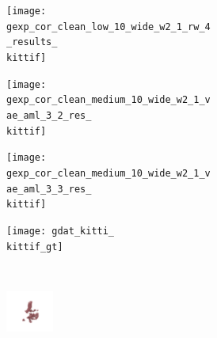 \begin{figure}[t]
{\begin{subfigure}[t]{0.5\textwidth}
\begin{subfigure}[t]{0.15\textwidth}
			\vspace{0px}\centering
			\texttt{[image: gexp\_cor\_clean\_low\_10\_wide\_w2\_1\_rw\_4\_results\_\\kittif]}
		\end{subfigure}
		\begin{subfigure}[t]{0.15\textwidth}
			\vspace{0px}\centering
			\texttt{[image: gexp\_cor\_clean\_medium\_10\_wide\_w2\_1\_vae\_aml\_3\_2\_res\_\\kittif]}
		\end{subfigure}
		\begin{subfigure}[t]{0.15\textwidth}
			\vspace{0px}\centering
			\texttt{[image: gexp\_cor\_clean\_medium\_10\_wide\_w2\_1\_vae\_aml\_3\_3\_res\_\\kittif]}
		\end{subfigure}
		\begin{subfigure}[t]{0.15\textwidth}
			\vspace{0px}\centering
			\texttt{[image: gdat\_kitti\_\\kittif\_gt]}
		\end{subfigure}
	\end{subfigure}
	\\[4px]
	\begin{subfigure}[t]{0.5\textwidth}
        \vspace{0px}\centering
		\begin{subfigure}[t]{0.01\textwidth}
			\vspace{0px}\centering
		\end{subfigure}
		\begin{subfigure}[t]{0.15\textwidth}
			\vspace{0px}\centering
			\includegraphics[width=1.55cm,trim={\cropleft cm \croplower cm \cropright cm \cropupper cm},clip]{gdat_yang_chair_0_bin_points}
		\end{subfigure}
		\begin{subfigure}[t]{0.15\textwidth}

\end{subfigure}
\end{subfigure}}
\end{figure}
